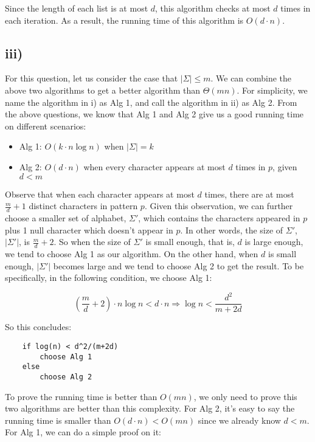 Since the length of each list is at most $d$, this algorithm checks at most $d$ times in each iteration.  As a result, the running time of this algorithm is $O(d\cdot n)$.

\subsection*{iii)}

For this question, let us consider the case that $|\Sigma|\leq m$.  We can combine the above two algorithms to get a better algorithm than $\Theta(mn)$.  For simplicity, we name the algorithm in i) as Alg 1, and call the algorithm in ii) as Alg 2.  From the above questions, we know that Alg 1 and Alg 2 give us a good running time on different scenarios:

\begin{itemize}
\item Alg 1: $O(k\cdot n\log n)$ when $|\Sigma|=k$
\item Alg 2: $O(d\cdot n)$ when every character appears at most $d$ times in $p$, given $d<m$
\end{itemize}

Observe that when each character appears at most $d$ times, there are at most $\frac{m}{d}+1$ distinct characters in pattern $p$.  Given this observation, we can further choose a smaller set of alphabet, $\Sigma'$, which contains the characters appeared in $p$ plus 1 null character which doesn't appear in $p$.  In other words, the size of $\Sigma'$, $|\Sigma'|$, is $\frac{m}{d}+2$.  So when the size of $\Sigma'$ is small enough, that is, $d$ is large enough, we tend to choose Alg 1 as our algorithm.  On the other hand, when $d$ is small enough, $|\Sigma'|$ becomes large and we tend to choose Alg 2 to get the result.  To be specifically, in the following condition, we choose Alg 1:

\[ (\frac{m}{d}+2) \cdot n \log n < d \cdot n \Rightarrow \log n < \frac{d^2}{m+2d} \]

So this concludes:

\begin{verbatim}
    if log(n) < d^2/(m+2d)
        choose Alg 1
    else
        choose Alg 2
\end{verbatim}

To prove the running time is better than $O(mn)$, we only need to prove this two algorithms are better than this complexity.  For Alg 2, it's easy to say the running time is smaller than $O(d\cdot n) < O(mn)$ since we already know $d<m$.  For Alg 1, we can do a simple proof on it:

